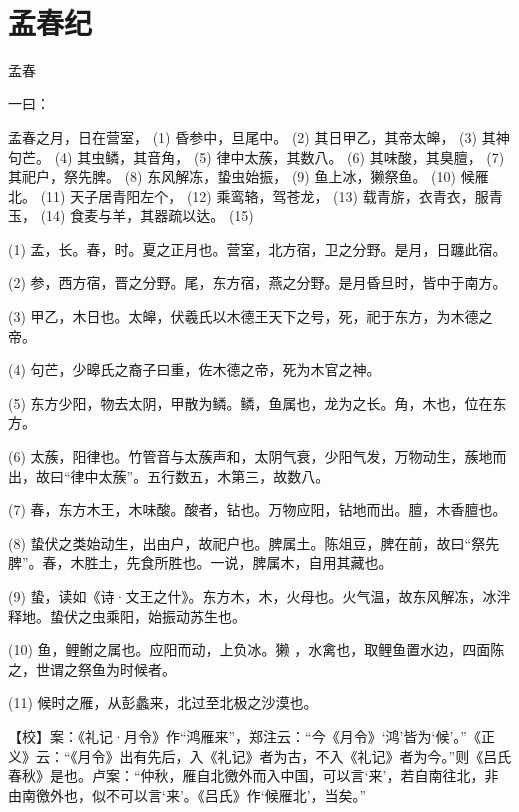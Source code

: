 \documentclass[12pt,UTF8]{ctexbook}
\begin{document}
\mainmatter

~\\

 \qquad  

\part{孟春纪}



孟春


一曰：

孟春之月，日在营室， (1) 昏参中，旦尾中。 (2) 其日甲乙，其帝太皞， (3) 其神句芒。 (4) 其虫鳞，其音角， (5) 律中太蔟，其数八。 (6) 其味酸，其臭膻， (7) 其祀户，祭先脾。 (8) 东风解冻，蛰虫始振， (9) 鱼上冰，獭祭鱼。 (10) 候雁北。 (11) 天子居青阳左个， (12) 乘鸾辂，驾苍龙， (13) 载青旂，衣青衣，服青玉， (14) 食麦与羊，其器疏以达。 (15)

(1) 孟，长。春，时。夏之正月也。营室，北方宿，卫之分野。是月，日躔此宿。

(2) 参，西方宿，晋之分野。尾，东方宿，燕之分野。是月昏旦时，皆中于南方。

(3) 甲乙，木日也。太皞，伏羲氏以木德王天下之号，死，祀于东方，为木德之帝。

(4) 句芒，少暤氏之裔子曰重，佐木德之帝，死为木官之神。

(5) 东方少阳，物去太阴，甲散为鳞。鳞，鱼属也，龙为之长。角，木也，位在东方。

(6) 太蔟，阳律也。竹管音与太蔟声和，太阴气衰，少阳气发，万物动生，蔟地而出，故曰“律中太蔟”。五行数五，木第三，故数八。

(7) 春，东方木王，木味酸。酸者，钻也。万物应阳，钻地而出。膻，木香膻也。

(8) 蛰伏之类始动生，出由户，故祀户也。脾属土。陈俎豆，脾在前，故曰“祭先脾”。春，木胜土，先食所胜也。一说，脾属木，自用其藏也。

(9) 蛰，读如《诗·文王之什》。东方木，木，火母也。火气温，故东风解冻，冰泮释地。蛰伏之虫乘阳，始振动苏生也。

(10) 鱼，鲤鲋之属也。应阳而动，上负冰。獭 ，水禽也，取鲤鱼置水边，四面陈之，世谓之祭鱼为时候者。

(11) 候时之雁，从彭蠡来，北过至北极之沙漠也。

【校】案：《礼记·月令》作“鸿雁来”，郑注云：“今《月令》‘鸿’皆为‘候’。”《正义》云：“《月令》出有先后，入《礼记》者为古，不入《礼记》者为今。”则《吕氏春秋》是也。卢案：“仲秋，雁自北徼外而入中国，可以言‘来’，若自南往北，非由南徼外也，似不可以言‘来’。《吕氏》作‘候雁北’，当矣。”
\end{document}
